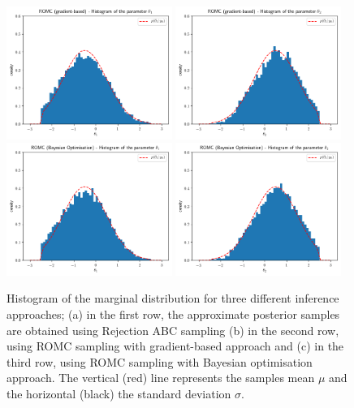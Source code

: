 \begin{figure}[h]
    \begin{center}
      \includegraphics[width=0.48\textwidth]{./Thesis/images/chapter4/ex2D_hist_t1_romc.png}
      \includegraphics[width=0.48\textwidth]{./Thesis/images/chapter4/ex2D_hist_t2_romc.png}\\
      \includegraphics[width=0.48\textwidth]{./Thesis/images/chapter4/ex2D_hist_t1_romc_bo.png}
      \includegraphics[width=0.48\textwidth]{./Thesis/images/chapter4/ex2D_hist_t2_romc_bo.png}\\
    \end{center}
    \caption{Histogram of the marginal distribution for three
      different inference approaches; (a) in the first row, the
      approximate posterior samples are obtained using Rejection ABC
      sampling (b) in the second row, using ROMC sampling with
      gradient-based approach and (c) in the third row, using ROMC
      sampling with Bayesian optimisation approach. The vertical (red)
      line represents the samples mean $\mu$ and the horizontal
      (black) the standard deviation $\sigma$.}
  \label{fig:ex2_3}
\end{figure}

